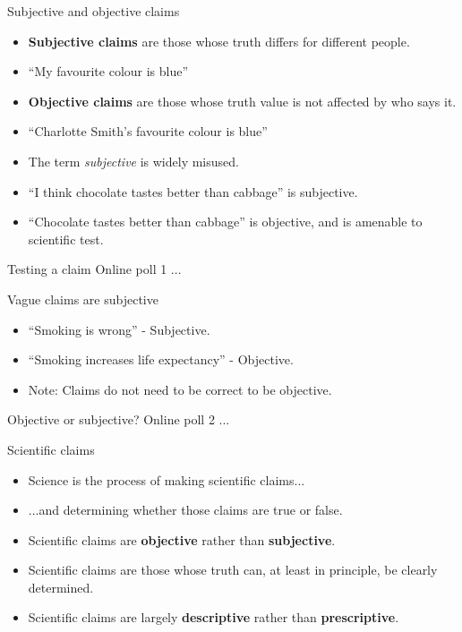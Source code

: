 \documentclass{beamer}
\begin{document}
\begin{frame}{Subjective and objective claims}
	\begin{itemize}
		\item \textbf{Subjective claims} are those whose truth differs for different people.
		\item ``My favourite colour is blue''
		\item \textbf{Objective claims} are those whose truth value is not affected by who says it.
		\item ``Charlotte Smith's favourite colour is blue''
		\item The term \emph{subjective} is widely misused.
		\item ``I think chocolate tastes better than cabbage'' is subjective.
		\item ``Chocolate tastes better than cabbage'' is objective, and is amenable to scientific test.
	\end{itemize}
\end{frame}

\begin{frame}{Testing a claim}
Online poll 1 ... 
\end{frame}

\begin{frame}{Vague claims are subjective}
\begin{itemize}
\item ``Smoking is wrong'' - Subjective.
\item ``Smoking increases life expectancy'' - Objective.
\item Note: Claims do not need to be correct to be objective.
\end{itemize}
\end{frame}

\begin{frame}{Objective or subjective?}
Online poll 2 ...
\end{frame}

\begin{frame}{Scientific claims}
	\begin{itemize}
		\item Science is the process of making scientific claims...
		\item ...and determining whether those claims are true or false.
		\item Scientific claims are \textbf{objective} rather than \textbf{subjective}.
		\item Scientific claims are those whose truth can, at least in principle, be clearly determined.
		\item Scientific claims are largely \textbf{descriptive} rather than \textbf{prescriptive}.
	\end{itemize}
\end{frame}
\end{document}
